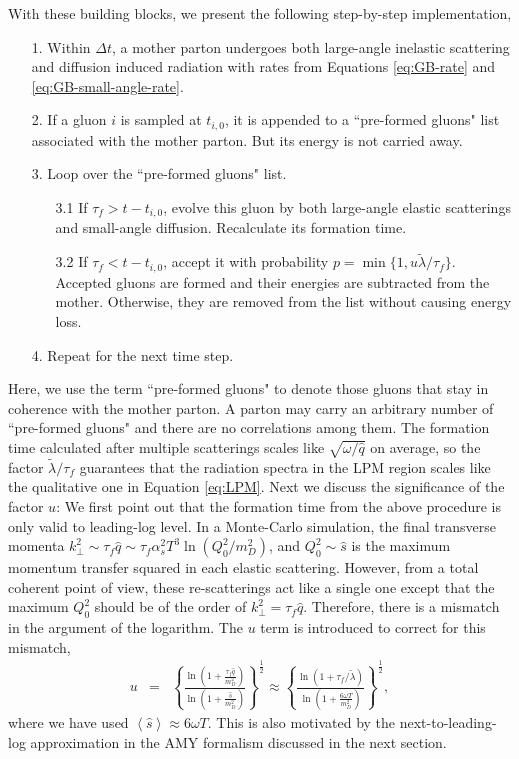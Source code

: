 \documentclass[aps, prc, reprint, amsmath, groupedaddress, nofootinbib]{revtex4-1}
\begin{document}
With these building blocks, we present the following step-by-step implementation,
\begin{itemize}
\item[1.] Within $\Delta t$, a mother parton undergoes both large-angle inelastic scattering and diffusion induced radiation with rates from Equations \ref{eq:GB-rate} and \ref{eq:GB-small-angle-rate}.
\item[2.] If a gluon $i$ is sampled at $t_{i,0}$, it is appended to a ``pre-formed gluons" list associated with the mother parton. But its energy is not carried away.
\item[3.] Loop over the ``pre-formed gluons" list. 
\begin{itemize}
\item[3.1] If $\tau_f > t-t_{i,0}$, evolve this gluon by both large-angle elastic scatterings and small-angle diffusion. Recalculate its formation time.
\item[3.2] If $\tau_f < t-t_{i,0}$, accept it with probability $p = \min\{1, u\tilde{\lambda}/\tau_f\}$. Accepted gluons are formed and their energies are subtracted from the mother. Otherwise, they are removed from the list without causing energy loss.
\end{itemize} 
\item[4.] Repeat for the next time step.
\end{itemize}
Here, we use the term ``pre-formed gluons" to denote those gluons that stay in coherence with the mother parton.
A parton may carry an arbitrary number of ``pre-formed gluons" and there are no correlations among them.
The formation time calculated after multiple scatterings scales like $\sqrt{\omega/\hat{q}}$ on average, so the factor $\tilde{\lambda}/\tau_f$ guarantees that the radiation spectra in the LPM region scales like the qualitative one in Equation \ref{eq:LPM}.
Next we discuss the significance of the factor $u$:
We first point out that the formation time from the above procedure is only valid to leading-log level.
In a Monte-Carlo simulation, the final transverse momenta $k_\perp^2\sim \tau_f \hat{q} \sim \tau_f \alpha_s^2 T^3 \ln(Q_0^2/m_D^2)$, 
and $Q_0^2\sim \hat{s}$ is the maximum momentum transfer squared in each elastic scattering.
However, from a total coherent point of view, these re-scatterings act like a single one except that the maximum $Q_0^2$ should be of the order of $k_\perp^2 = \tau_f \hat{q}$.
Therefore, there is a mismatch in the argument of the logarithm.
The $u$ term is introduced to correct for this mismatch,
\begin{eqnarray}
u &=& \left\{\frac{\ln\left(1+\frac{\tau_f\hat{q}}{m_D^2}\right)}{\ln\left(1+\frac{\hat{s}}{m_D^2}\right)}\right\}^{\frac{1}{2}}
\approx \left\{\frac{\ln\left(1+\tau_f/\tilde{\lambda}\right)}{\ln\left(1+\frac{6\omega T}{m_D^2}\right)}\right\}^{\frac{1}{2}},
\end{eqnarray} 
where we have used $\left\langle\hat{s}\right\rangle \approx 6 \omega T$.
This is also motivated by the next-to-leading-log approximation in the AMY formalism discussed in the next section.
\end{document}
